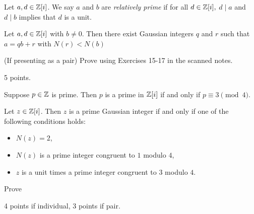 \documentclass[letterpaper, 11 pt,handout]{ximera}
\begin{document}
\begin{exploration}
\begin{definition}
 Let $a,d\in\mathbb Z[i]$. We say $a$ and $b$ are \emph{relatively prime} if for all $d\in\mathbb Z[i],$ $d\mid a$ and $d\mid b$ implies that $d$ is a unit.
\end{definition}

\begin{thm*}\label{div-gauss-int}
 Let $a,d\in\mathbb Z[i]$ with $b\neq 0$. Then there exist Gaussian integers $q$ and $r$ such that $a=qb+r$ with $N(r)<N(b)$
\end{thm*}

\begin{problem}(If presenting as a pair)
Prove  using Exercises 15-17 in the scanned notes.
	\begin{rubric}
 		5 points.
	\end{rubric}
\end{problem}

\begin{thm*}[Theorem 13.5.4]
 Suppose $p\in\mathbb Z$ is prime. Then $p$ is a prime in $\mathbb Z[i]$ if and only if $p\equiv 3\pmod{4}$.
\end{thm*}



\begin{thm*}[Theorem 13.5.5]\label{thm:guass-primes}
 Let $z\in\mathbb Z[i]$. Then $z$ is a prime Gaussian integer if and only if one of the following conditions holds:
 
\begin{itemize}
 \item $N(z)=2$,
 \item $N(z)$ is a prime integer congruent to $1$ modulo $4$,
 \item $z$ is a unit times a prime integer congruent to $3$ modulo $4$.
\end{itemize}
%
\end{thm*}

\begin{problem}
Prove 
	\begin{rubric}
 		4 points if individual, 3 points if pair.
	\end{rubric}
\end{problem}
\end{exploration}
\end{document}
